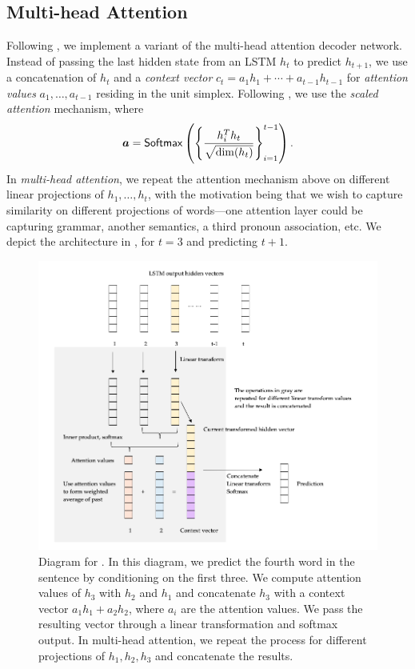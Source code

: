 \documentclass[12pt]{article}
\begin{document}
\subsection{Multi-head Attention}
\label{sub:attn}

Following \cite{vaswani2017attention}, we implement a variant of the multi-head
attention
decoder network. Instead of passing the last hidden state from an LSTM $h_t$ to
predict $h_{t+1}$, we use a concatenation of $h_t$ and a \emph{context vector}
$c_t = a_1 h_1 + \cdots + a_{t-1} h_{t-1}$ for \emph{attention values}
$a_1,\ldots, a_{t-1}$ residing in the unit simplex. Following 
\cite{vaswani2017attention}, we use the \emph{scaled attention} mechanism,
where \[
\bm a = \mathsf{Softmax}\left({\left\{{\frac{h_i^T h_t}{\sqrt{\dim(h_t)}}}\right\}_{i=1}^{t-1}}\right).
\]
In \emph{multi-head attention}, we repeat the attention mechanism above on
different linear projections of $h_1,\ldots,h_t$, with the motivation being that
we wish to capture similarity on different projections of words---one attention
layer could be capturing grammar, another semantics, a third pronoun
association, etc. We depict the architecture in , for $t=3$ and
predicting $t+1$.
\begin{figure}[tb]
    \centering
    \includegraphics[width=\textwidth]{figs/attention.png}
    \caption{Diagram for . In this diagram, we predict the
    fourth word in the sentence by conditioning on the first three. We compute
    attention values of $h_3$ with $h_2$ and $h_1$ and concatenate $h_3$ with a
    context vector $a_1 h_1 + a_2 h_2$, where $a_i$ are the attention values.
    We pass the resulting vector through a linear transformation and softmax
    output. In multi-head attention, we repeat the process for different
    projections of $h_1,h_2,h_3$ and concatenate the results.}
    \label{fig:attn}
\end{figure}
\end{document}
